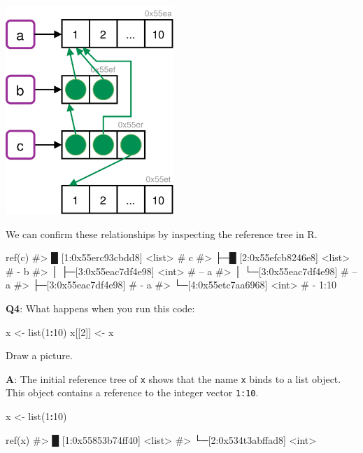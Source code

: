 \documentclass[
]{krantz}
\makeatletter
\newenvironment{Shaded}{\begin{snugshade}}{\end{snugshade}}
\newcommand{\CommentTok}[1]{\textcolor[rgb]{0.56,0.35,0.01}{\textit{#1}}}
\newcommand{\DecValTok}[1]{\textcolor[rgb]{0.00,0.00,0.81}{#1}}
\newcommand{\KeywordTok}[1]{\textcolor[rgb]{0.13,0.29,0.53}{\textbf{#1}}}
\newcommand{\NormalTok}[1]{#1}
\newcommand{\OperatorTok}[1]{\textcolor[rgb]{0.81,0.36,0.00}{\textbf{#1}}}
\newcommand{\StringTok}[1]{\textcolor[rgb]{0.31,0.60,0.02}{#1}}
\newenvironment{kframe}{%
\medskip{}
\setlength{\fboxsep}{.8em}
 \def\at@end@of@kframe{}%
 \ifinner\ifhmode%
  \def\at@end@of@kframe{\end{minipage}}%
  \begin{minipage}{\columnwidth}%
 \fi\fi%
 \def\FrameCommand##1{\hskip\@totalleftmargin \hskip-\fboxsep
 \colorbox{shadecolor}{##1}\hskip-\fboxsep
     \hskip-\linewidth \hskip-\@totalleftmargin \hskip\columnwidth}%
 \MakeFramed {\advance\hsize-\width
   \@totalleftmargin\z@ \linewidth\hsize
   \@setminipage}}%
 {\par\unskip\endMakeFramed%
 \at@end@of@kframe}
\renewenvironment{Shaded}{\begin{kframe}}{\end{kframe}}
\renewcommand{\KeywordTok} [1]{\textcolor[rgb]{0.00,0.44,0.13}{{#1}}}
\renewcommand{\DecValTok}  [1]{\textcolor[rgb]{0.25,0.63,0.44}{{#1}}}
\renewcommand{\StringTok}  [1]{\textcolor[rgb]{0.25,0.44,0.63}{{#1}}}
\renewcommand{\CommentTok} [1]{\textcolor[rgb]{0.38,0.63,0.69}{{#1}}}
\renewcommand{\NormalTok}  [1]{{#1}}
\makeatother
\begin{document}
\begin{center}\includegraphics[width=180pt]{images/names_values/copy_on_modify_fig3} \end{center}

We can confirm these relationships by inspecting the reference tree in R.

\begin{Shaded}
\begin{Highlighting}[]
\KeywordTok{ref}\NormalTok{(c)}
\CommentTok{#> █ [1:0x55erc93cbdd8] <list>    # c}
\CommentTok{#> ├─█ [2:0x55efcb8246e8] <list>  # - b}
\CommentTok{#> │ ├─[3:0x55eac7df4e98] <int>   # -- a}
\CommentTok{#> │ └─[3:0x55eac7df4e98]         # -- a}
\CommentTok{#> ├─[3:0x55eac7df4e98]           # - a}
\CommentTok{#> └─[4:0x55etc7aa6968] <int>     # - 1:10}
\end{Highlighting}
\end{Shaded}

\textbf{{Q4}}: What happens when you run this code:

\begin{Shaded}
\begin{Highlighting}[]
\NormalTok{x <-}\StringTok{ }\KeywordTok{list}\NormalTok{(}\DecValTok{1}\OperatorTok{:}\DecValTok{10}\NormalTok{)}
\NormalTok{x[[}\DecValTok{2}\NormalTok{]] <-}\StringTok{ }\NormalTok{x}
\end{Highlighting}
\end{Shaded}

Draw a picture.

\textbf{{A}}: The initial reference tree of \texttt{x} shows that the name \texttt{x} binds to a list object. This object contains a reference to the integer vector \texttt{1:10}.

\begin{Shaded}
\begin{Highlighting}[]
\NormalTok{x <-}\StringTok{ }\KeywordTok{list}\NormalTok{(}\DecValTok{1}\OperatorTok{:}\DecValTok{10}\NormalTok{)}

\KeywordTok{ref}\NormalTok{(x)}
\CommentTok{#> █ [1:0x55853b74ff40] <list> }
\CommentTok{#> └─[2:0x534t3abffad8] <int> }
\end{Highlighting}
\end{Shaded}
\end{document}
